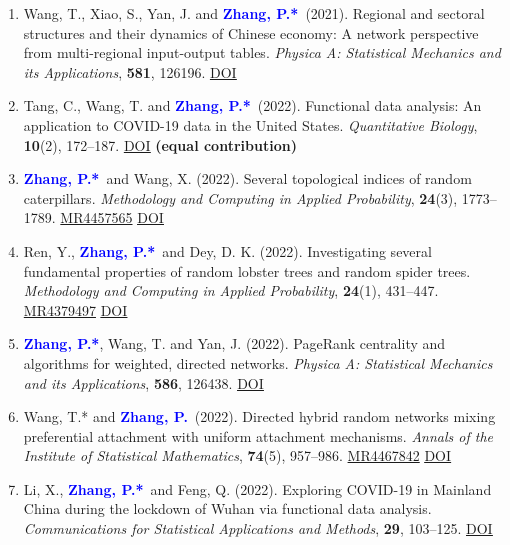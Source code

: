 \documentclass[12pt]{article}
\def\MR#1{\href{http://www.ams.org/mathscinet-getitem?mr=#1}{MR#1}}
\newcommand{\PZ}{\textcolor{blue}{\textbf{Zhang, P.*}}}
\newcommand{\PZnot}{\textcolor{blue}{\textbf{Zhang, P.}}}
\begin{document}
\begin{enumerate}
		\item {\sc Wang, T., Xiao, S., Yan, J.} and \PZ\ 
		(2021). Regional and sectoral structures and their dynamics of Chinese economy: A network perspective from
		multi-regional input-output tables. {\em Physica A: Statistical Mechanics and its Applications}, {\bf 581}, 126196.	\href{https://doi.org/10.1016/j.physa.2021.126196}
		{\underline{DOI}}
		
		\item {\sc Tang, C., Wang, T.} and \PZ\ (2022). 
		Functional data analysis: An application to COVID-19 data in
		the United States. {\em Quantitative Biology}, {\bf 10}(2), 
		172--187. \href{https://doi.org/10.15302/J-QB-022-0300}
		{\underline{DOI}} {\bf (equal contribution)}
		
		\item \PZ\ and {\sc Wang, X.} (2022). Several 
		topological indices of random caterpillars. 
		{\em Methodology and Computing in Applied Probability}, {\bf 24}(3), 1773--1789. \MR{4457565} 
		\href{https://doi.org/10.1007/s11009-021-09895-1}
		{\underline{DOI}} 
		
		\item {\sc Ren, Y.}, \PZ\ and {\sc Dey, D. K.} (2022). 
		Investigating several fundamental properties of random 
		lobster trees and random spider trees. {\em Methodology and 
		Computing in Applied Probability}, {\bf 24}(1), 431--447. 
		\MR{4379497} \href{https://doi.org/10.1007/s11009-021-09863-9}
		{\underline{DOI}}
		
		\item \PZ, {\sc Wang, T.} and {\sc Yan, J.} (2022). PageRank centrality and algorithms for weighted, directed networks. {\em Physica A: Statistical Mechanics and its Applications}, {\bf 586}, 126438. 
		\href{https://doi.org/10.1016/j.physa.2021.126438}
		{\underline{DOI}}
		
		\item {\sc Wang, T.*} and \PZnot\ (2022). Directed 
		hybrid random networks mixing preferential attachment with 
		uniform attachment mechanisms. {\em Annals of the Institute of Statistical Mathematics}, {\bf 74}(5), 957--986. \MR{4467842}
		\href{https://doi.org/10.1007/s10463-022-00827-5}
		{\underline{DOI}}
		
		\item {\sc Li, X.}, \PZ\ and {\sc Feng, Q.} (2022). Exploring COVID-19 in Mainland China during the lockdown of Wuhan via functional data analysis. {\em Communications for Statistical Applications and Methods}, {\bf 29}, 103--125. 
		\href{https://doi.org/10.29220/CSAM.2022.29.1.103}
		{\underline{DOI}}
		

\end{enumerate}
\end{document}
